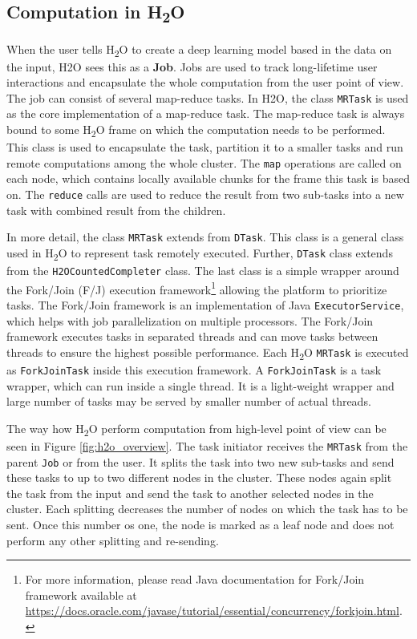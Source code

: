 \subsection{Computation in H\textsubscript{2}O}
When the user tells H\textsubscript{2}O to create a deep learning model based in the data on the input, H2O sees this as a \textbf{Job}. Jobs are used to track long-lifetime user interactions and encapsulate the whole computation from the user point of view. The job can consist of several map-reduce tasks. In H2O, the class \texttt{MRTask} is used as the core implementation of a map-reduce task. The map-reduce task is always bound to some H\textsubscript{2}O frame on which the computation needs to be performed. This class is used to encapsulate the task, partition it to a smaller tasks and run remote computations among the whole cluster. The \texttt{map} operations are called on each node, which contains locally available chunks for the frame this task is based on. The \texttt{reduce} calls are used to reduce the result from two sub-tasks into a new task with combined result from the children.

In more detail, the class \texttt{MRTask} extends from \texttt{DTask}. This class is a general class used in H\textsubscript{2}O to represent task remotely executed. Further, \texttt{DTask} class extends from the \texttt{H2OCountedCompleter} class. The last class is a simple wrapper around the Fork/Join (F/J) execution framework\footnote{For more information, please read Java documentation for Fork/Join framework available at \url{https://docs.oracle.com/javase/tutorial/essential/concurrency/forkjoin.html}.} allowing the platform to prioritize tasks. The Fork/Join framework is an implementation of Java \texttt{ExecutorService}, which helps with job parallelization on multiple processors. The Fork/Join framework executes tasks in separated threads and can move tasks between threads to ensure the highest possible performance. Each H\textsubscript{2}O \texttt{MRTask} is executed as \texttt{ForkJoinTask} inside this execution framework. A \texttt{ForkJoinTask} is a task wrapper, which can run inside a single thread. It is a light-weight wrapper and large number of tasks may be served by smaller number of actual threads.

The way how H\textsubscript{2}O perform computation from high-level point of view can be seen in Figure \ref{fig:h2o_overview}. The task initiator receives the \texttt{MRTask} from the parent \texttt{Job} or from the user. It splits the task into two new sub-tasks and send these tasks to up to two different nodes in the cluster. These nodes again split the task from the input and send the task to another selected nodes in the cluster. Each splitting decreases the number of nodes on which the task has to be sent. Once this number os one, the node is marked as a leaf node and does not perform any other splitting and re-sending.

